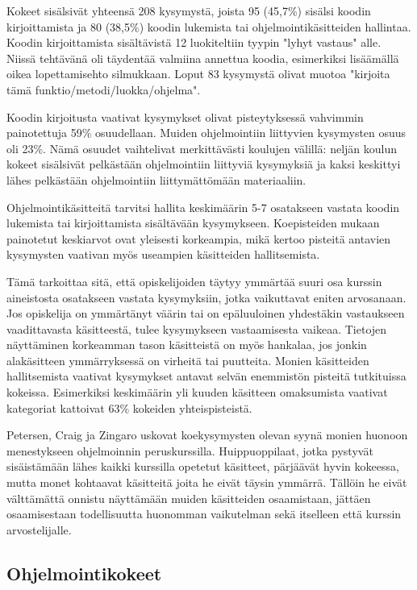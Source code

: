 \documentclass[finnish]{../tktltiki2}
\theoremstyle{definition}
\theoremstyle{remark}
\begin{document}
Kokeet sisälsivät yhteensä 208 kysymystä, joista 95 (45,7\%) sisälsi koodin kirjoittamista ja 80 (38,5\%) koodin lukemista tai ohjelmointikäsitteiden hallintaa. Koodin kirjoittamista sisältävistä 12 luokiteltiin tyypin "lyhyt vastaus" alle. Niissä tehtävänä oli täydentää valmiina annettua koodia, esimerkiksi lisäämällä oikea lopettamisehto silmukkaan. Loput 83 kysymystä olivat muotoa "kirjoita tämä funktio/metodi/luokka/ohjelma".

Koodin kirjoitusta vaativat kysymykset olivat pisteytyksessä vahvimmin painotettuja 59\% osuudellaan. Muiden ohjelmointiin liittyvien kysymysten osuus oli 23\%. Nämä osuudet vaihtelivat merkittävästi koulujen välillä: neljän koulun kokeet sisälsivät pelkästään ohjelmointiin liittyviä kysymyksiä ja kaksi keskittyi lähes pelkästään ohjelmointiin liittymättömään materiaaliin.

Ohjelmointikäsitteitä tarvitsi hallita keskimäärin 5-7 osatakseen vastata koodin lukemista tai kirjoittamista sisältävään kysymykseen. Koepisteiden mukaan painotetut keskiarvot ovat yleisesti korkeampia, mikä kertoo pisteitä antavien kysymysten vaativan myös useampien käsitteiden hallitsemista.

Tämä tarkoittaa sitä, että opiskelijoiden täytyy ymmärtää suuri osa kurssin aineistosta osatakseen vastata kysymyksiin, jotka vaikuttavat eniten arvosanaan. Jos opiskelija on ymmärtänyt väärin tai on epäluuloinen yhdestäkin vastaukseen vaadittavasta käsitteestä, tulee kysymykseen vastaamisesta vaikeaa. Tietojen näyttäminen korkeamman tason käsitteistä on myös hankalaa, jos jonkin alakäsitteen ymmärryksessä on virheitä tai puutteita. Monien käsitteiden hallitsemista vaativat kysymykset antavat selvän enemmistön pisteitä tutkituissa kokeissa. Esimerkiksi keskimäärin yli kuuden käsitteen omaksumista vaativat kategoriat kattoivat 63\% kokeiden yhteispisteistä.

Petersen, Craig ja Zingaro uskovat koekysymysten olevan syynä monien huonoon menestykseen ohjelmoinnin peruskurssilla. Huippuoppilaat, jotka pystyvät sisäistämään lähes kaikki kurssilla opetetut käsitteet, pärjäävät hyvin kokeessa, mutta monet kohtaavat käsitteitä joita he eivät täysin ymmärrä. Tällöin he eivät välttämättä onnistu näyttämään muiden käsitteiden osaamistaan, jättäen osaamisestaan todellisuutta huonomman vaikutelman sekä itselleen että kurssin arvostelijalle.

\subsection{Ohjelmointikokeet}
\end{document}
